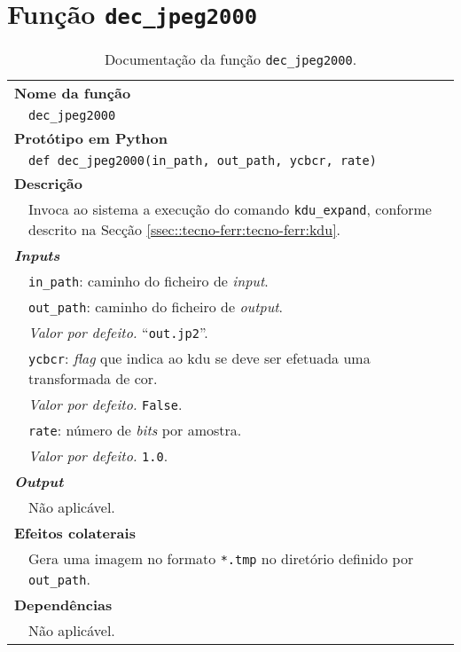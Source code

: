 \newpage
\section{Função \texttt{dec\_jpeg2000}}
\label{sec::doc-codigo:dec_jpeg2000}

\begin{table}[!hp]
    \centering
    \caption{Documentação da função \texttt{dec\_jpeg2000}.}
    \label{tab:dec_jpeg2000}
    \begin{tabular}{p{1cm} p{11.5cm}}
        \hline
        \multicolumn{2}{l}{\bfseries\small Nome da função}\\
         & \verb|dec_jpeg2000|\\
        \hline
        \multicolumn{2}{l}{\bfseries\small Protótipo em Python}\\
         & \texttt{def dec_jpeg2000(in_path, out_path, ycbcr, rate)} \\
        \hline\multicolumn{2}{l}{\bfseries\small Descrição}\\
         & Invoca ao sistema a execução do comando \verb|kdu_expand|, conforme descrito na Secção \ref{ssec::tecno-ferr:tecno-ferr:kdu}. \\
        \hline\multicolumn{2}{l}{\bfseries\small \textit{Inputs}}\\
         & \verb|in_path|: caminho do ficheiro de \textit{input}. \\
         & \verb|out_path|: caminho do ficheiro de \textit{output}. \\
         & \hspace{1cm} \textit{Valor por defeito.} ``\verb|out.jp2|''.\\
         & \verb|ycbcr|: \textit{flag} que indica ao \ac{kdu} se deve ser efetuada uma transformada de cor. \\
         & \hspace{1cm} \textit{Valor por defeito.} \verb|False|.\\
         & \verb|rate|: número de \textit{bits} por amostra. \\
         & \hspace{1cm} \textit{Valor por defeito.} \verb|1.0|.\\
        \hline\multicolumn{2}{l}{\bfseries\small \textit{Output}}\\
         & Não aplicável. \\
        \hline\multicolumn{2}{l}{\bfseries\small Efeitos colaterais}\\
         & Gera uma imagem no formato \verb|*.tmp| no diretório definido por \verb|out_path|. \\
        \hline\multicolumn{2}{l}{\bfseries\small Dependências}\\
         & Não aplicável. \\
        \hline
    \end{tabular}
\end{table}



